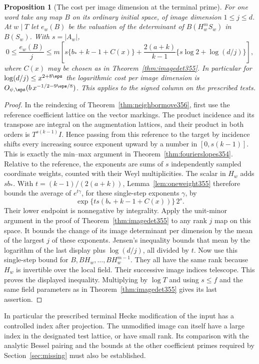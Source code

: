 \documentclass[a4paper,11pt]{article}
\newtheorem{proposition}{Proposition}[section]
\theoremstyle{definition}
\theoremstyle{remark}
\numberwithin{equation}{section}
\begin{document}
\begin{proposition}[The cost per image dimension at the terminal prime]\leavevmode
\label{prop:neighborrank356}
For one word take any map \(B\) on its ordinary initial
space, of image dimension \(1\le j\le d\). At \(w\mid T\)
let \(e_w(B)\) be the valuation of the determinant of
\(B(H_w^m S_w)\) in \(B(S_w)\). With \(s=|A_w|\),
\[
  0\le \frac{e_w(B)}{j}
     \le m\left[
        s\{b_*+k-1+C(x)\}
       +\frac{2(a+k)}{k-1}\{s\log2+\log(d/j)\}\right],
\]
where \(C(x)\) may be chosen as in
Theorem~\ref{thm:imagedet355}. In particular for
\(\log(d/j)\le x^{2+8\eps}\) the logarithmic cost per
image dimension is \(O_{\psi,\eps}(b\,x^{-1/2-9\eps/8})\).
This applies to the signed column on the prescribed tests.
\end{proposition}
\begin{proof}
In the reindexing of Theorem~\ref{thm:neighbormove356},
first use the reference coefficient lattice on the vector
markings. The product incidence and its transpose are
integral on the augmentation lattices, and their product
in both orders is \(T^{s(k-1)}I\). Hence passing from this
reference to the target by incidence shifts every increasing
source exponent upward by a number in \([0,s(k-1)]\).
This is exactly the min--max argument in
Theorem~\ref{thm:fourierslopes354}. Relative to the reference,
the exponents are sums of \(s\) independently sampled
coordinate weights, counted with their Weyl multiplicities.
The scalar in \(H_w\) adds \(s b_*\). With
\(t=(k-1)/(2(a+k))\), Lemma~\ref{lem:oneweight355} therefore
bounds the average of \(e^{t\gamma}\), for these single-step
exponents \(\gamma\), by
\[
        \exp\{t s(b_*+k-1+C(x))\}\,2^s .
\]
Their lower endpoint is nonnegative by integrality.
Apply the unit-minor argument in the proof of
Theorem~\ref{thm:imagedet355} to any rank \(j\) map on
this space. It bounds the change of its image determinant
per dimension by the mean of the largest \(j\) of these
exponents. Jensen's inequality bounds that mean by the
logarithm of the last display plus \(\log(d/j)\), all
divided by \(t\). Now use this single-step bound for
\(B,BH_w,\ldots,BH_w^{m-1}\). They all have the same
rank because \(H_w\) is invertible over the local field.
Their successive image indices telescope. This proves
the displayed inequality. Multiplying by \(\log T\) and
using \(s\le f\) and the same field parameters as in
Theorem~\ref{thm:imagedet355} gives its last assertion.
\end{proof}

In particular the prescribed terminal Hecke modification of
the input has a controlled index after projection. The
unmodified image can itself have a large index in the
designated test lattice, or have small rank. Its comparison
with the analytic Bessel pairing and the bounds at the other
coefficient primes required by Section~\ref{sec:missing}
must also be established.
\end{document}
